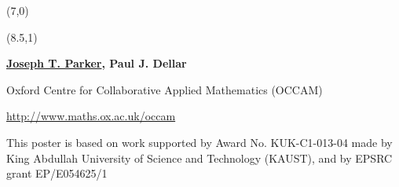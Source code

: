 \documentclass[a0]{a0poster}
\begin{document}
\background
{
%
\logos

\selectfont

\begin{textblock}{17}(7,0)

\vspace{-2.8cm}
\end{textblock}

%

\begin{textblock}{14}(8.5,1)
\begin{center}
\vspace{-1.4cm}
{\bfseries\Large \underline{Joseph T. Parker}, Paul J. Dellar} %

Oxford Centre for Collaborative Applied Mathematics (OCCAM)

\url{http://www.maths.ox.ac.uk/occam}

\smallskip

This poster is based on work supported by Award No. KUK-C1-013-04 made by\\
King Abdullah University of Science and Technology (KAUST), and by EPSRC grant EP/E054625/1
\end{center}
\vspace{-0.2cm}
\end{textblock}
}


\sffamily

\end{document}
